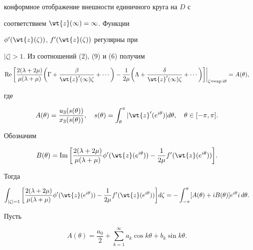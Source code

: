 конформное отображение внешности единичного круга на $D$ с


соответствием $\wt{z}(\infty) = \infty$. Функции


$\phi'(\wt{z}(\zeta))$, $f'(\wt{z}(\zeta))$ регулярны при


$|\zeta| > 1$. Из соотношений (2), (9) и (6) получим


\begin{equation}


\re\bigg[\frac{2(\lambda + 2\mu)}{\mu(\lambda + \mu)} \bigg(\Gamma


+ \frac{\beta}{\wt{z}'(\infty)\zeta} + \dotsb\bigg) -


\frac{1}{2\mu}\bigg(\Lambda + \frac{\delta}{\wt{z}'(\infty) \zeta}


+\dotsb\bigg)\bigg]\bigg|_{\zeta = \exp i\theta} = A(\theta),


\end{equation}


где


$$


A(\theta) = \frac{u_3(s(\theta))}{x_3(s(\theta))},\quad s(\theta) =


\int_{\theta}^{\pi} |\wt{z}'(e^{i\theta})| d\theta,\quad \theta \in [-\pi,\pi].


$$


Обозначим


$$


B(\theta) = \im \bigg[\frac{2(\lambda + 2\mu)}{\mu(\lambda +


\mu)} \phi'(\wt{z}(e^{i\theta})) - \frac{1}{2\mu}


f'(\wt{z}(e^{i\theta}))\bigg].


$$


Тогда


$$


\int_{|\zeta| = 1} \bigg[\frac{2(\lambda + 2\mu)}{\mu(\lambda +


\mu)} \phi'(\wt{z}(e^{i\theta})) - \frac{1}{2\mu}


f'(\wt{z}(e^{i\theta}))\bigg] d\zeta = - \int_{-\pi}^{\pi}


[A(\theta) + i B(\theta)] e^{i\theta} i\,d\theta.


$$


Пусть


$$


A(\theta) = \frac{a_0}{2} + \sum_{k=1}^{\infty} a_k \cos k\theta + b_k


\sin k\theta.


$$


